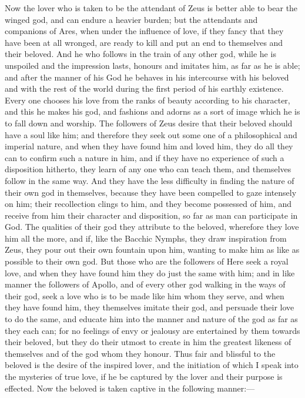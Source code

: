 \documentclass[11pt,letter]{article}
\begin{document}
\par  Now the lover who is taken to be the attendant of Zeus is better able to bear the winged god, and can endure a heavier burden; but the attendants and companions of Ares, when under the influence of love, if they fancy that they have been at all wronged, are ready to kill and put an end to themselves and their beloved. And he who follows in the train of any other god, while he is unspoiled and the impression lasts, honours and imitates him, as far as he is able; and after the manner of his God he behaves in his intercourse with his beloved and with the rest of the world during the first period of his earthly existence. Every one chooses his love from the ranks of beauty according to his character, and this he makes his god, and fashions and adorns as a sort of image which he is to fall down and worship. The followers of Zeus desire that their beloved should have a soul like him; and therefore they seek out some one of a philosophical and imperial nature, and when they have found him and loved him, they do all they can to confirm such a nature in him, and if they have no experience of such a disposition hitherto, they learn of any one who can teach them, and themselves follow in the same way. And they have the less difficulty in finding the nature of their own god in themselves, because they have been compelled to gaze intensely on him; their recollection clings to him, and they become possessed of him, and receive from him their character and disposition, so far as man can participate in God. The qualities of their god they attribute to the beloved, wherefore they love him all the more, and if, like the Bacchic Nymphs, they draw inspiration from Zeus, they pour out their own fountain upon him, wanting to make him as like as possible to their own god. But those who are the followers of Here seek a royal love, and when they have found him they do just the same with him; and in like manner the followers of Apollo, and of every other god walking in the ways of their god, seek a love who is to be made like him whom they serve, and when they have found him, they themselves imitate their god, and persuade their love to do the same, and educate him into the manner and nature of the god as far as they each can; for no feelings of envy or jealousy are entertained by them towards their beloved, but they do their utmost to create in him the greatest likeness of themselves and of the god whom they honour. Thus fair and blissful to the beloved is the desire of the inspired lover, and the initiation of which I speak into the mysteries of true love, if he be captured by the lover and their purpose is effected. Now the beloved is taken captive in the following manner:—
\end{document}
